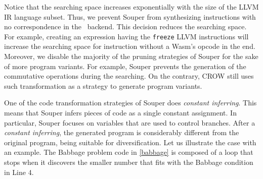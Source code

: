 Notice that the searching space increases exponentially with the size of the LLVM IR language subset. Thus,
we prevent Souper from synthesizing instructions with no correspondence in the \wasm\ backend. This decision reduces the searching space. For example, creating an expression having the  \texttt{freeze} LLVM instructions will increase the searching space for instruction without a Wasm's opcode in the end.
Moreover, we disable the majority of the pruning strategies of Souper for the sake of more program variants.
For example, Souper prevents the generation of the commutative operations during the searching.
On the contrary, CROW still uses such transformation as a strategy to generate program variants. 


One of the code transformation strategies of Souper does \emph{constant inferring}. This means that Souper infers pieces of code as a single constant assignment. In particular, Souper focuses on variables that are used to control branches.
After a \emph{constant inferring}, the generated program is considerably different from the original program, being suitable for diversification.
Let us illustrate the case with an example.
The Babbage problem code in \autoref{babbage} is composed of a loop that stops when it discovers the smaller number that fits with the Babbage condition in Line 4.


